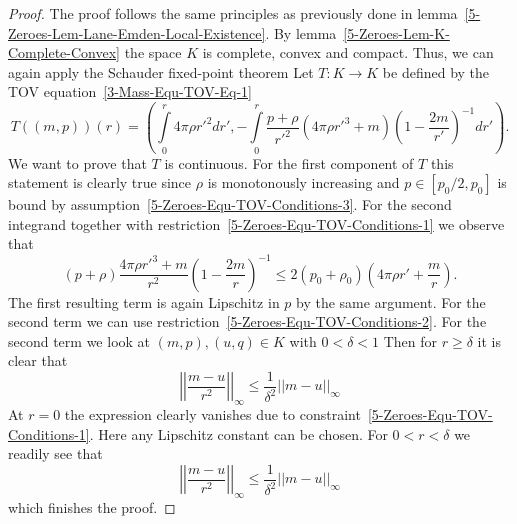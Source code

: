 \begin{proof}
	The proof follows the same principles as previously done in lemma~\ref{5-Zeroes-Lem-Lane-Emden-Local-Existence}.
	By lemma~\ref{5-Zeroes-Lem-K-Complete-Convex} the space $K$ is complete, convex and compact.
	Thus, we can again apply the Schauder fixed-point theorem
	Let $T:K\rightarrow K$ be defined by the \ac{TOV} equation~\eqref{3-Mass-Equ-TOV-Eq-1}
	\[
		T((m,p))(r)=\left(\int\limits_0^r 4\pi\rho r'^2 dr',-\int\limits_0^r\frac{p+\rho}{r'^2}(4\pi\rho r'^3 + m)\left(1-\frac{2m}{r'}\right)^{-1}dr'\right).
	\]
	We want to prove that $T$ is continuous.
	For the first component of $T$ this statement is clearly true since $\rho$ is monotonously increasing and $p\in[p_0/2,p_0]$ is bound by assumption~\eqref{5-Zeroes-Equ-TOV-Conditions-3}.
	For the second integrand together with restriction~\eqref{5-Zeroes-Equ-TOV-Conditions-1} we observe that
	\[
		(p+\rho)\frac{4\pi\rho r'^3+m}{r^2}\left(1-\frac{2 m}{r}\right)^{-1} \leq2(p_0+\rho_0)\left(4\pi\rho r'+\frac{m}{r}\right).
	\]
	The first resulting term is again Lipschitz in $p$ by the same argument.
	For the second term we can use restriction~\eqref{5-Zeroes-Equ-TOV-Conditions-2}.
	For the second term we look at $(m,p),(u,q)\in K$ with $0<\delta<1$
	Then for $r\geq\delta$ it is clear that
	\[
		\left|\left|\frac{m-u}{r^2}\right|\right|_{\infty}\leq\frac{1}{\delta^2}\left|\left|m-u\right|\right|_{\infty}
	\]
	At $r=0$ the expression clearly vanishes due to constraint~\eqref{5-Zeroes-Equ-TOV-Conditions-1}.
	Here any Lipschitz constant can be chosen.
	For $0<r<\delta$ we readily see that
	\[
		\left|\left|\frac{m-u}{r^2}\right|\right|_{\infty}\leq\frac{1}{\delta^2}\left|\left|m-u\right|\right|_{\infty}
	\]
	which finishes the proof.
\end{proof}

